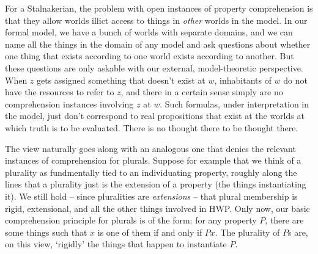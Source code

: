 \documentclass{article}
\begin{document}
For a Stalnakerian, the problem with open instances of property comprehension
is that they allow worlds illict access to things in \emph{other} 
worlds in the model.
In our formal model, we have a bunch of worlds with separate domains,
and we can name all the things in the domain of any model and ask 
questions about whether one thing that exists according to one world 
exists according to another. But these questions are only askable with 
our external, model-theoretic perspective. 
When $z$ gets assigned something that doesn't exist at $w$, 
inhabitants of $w$ do not have the resources to refer to $z$, 
and there in a certain sense simply are no comprehension instances 
involving $z$ at $w$.
Such formulas, 
under interpretation in the model,
just don't correspond to real propositions that exist at the 
worlds at which truth is to be evaluated.
There is no thought there to be thought there.

The view naturally goes along with an analogous one that
denies the relevant instances of comprehension for plurals.
Suppose for example that we think of a plurality as fundmentally 
tied to an individuating property, roughly along the lines that 
a plurality just is the extension of a property (the things instantiating it).
We still hold -- since pluralities are \emph{extensions} -- that plural membership 
is rigid, extensional, and all the other things involved in HWP. Only now, 
our basic comprehension principle for plurals is of the form: for any property 
$P$, there are some things such that $x$ is one of them if and only if $Px$. 
The plurality of $P$s are, on this view, `rigidly' 
the things that happen to instantiate $P$. 
\end{document}
